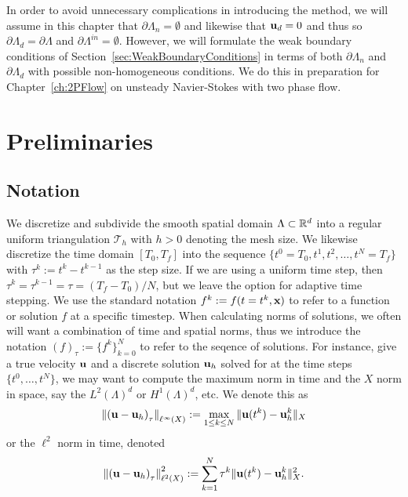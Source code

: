 \documentclass[letterpaper]{erdc}
\begin{document}
In order to avoid unnecessary complications in introducing the method, we will assume in this chapter that $\partial\Lambda_n=\emptyset$ and  likewise that $\textbf{u}_d = 0$ and thus so $\partial\Lambda_d=\partial\Lambda$ and $\partial\Lambda^{in}=\emptyset$.  However, we will formulate the weak boundary conditions of Section~\ref{sec:WeakBoundaryConditions} in terms of both $\partial\Lambda_n$ and $\partial\Lambda_d$ with possible non-homogeneous conditions.  We do this in preparation for Chapter~\ref{ch:2PFlow} on unsteady Navier-Stokes with two phase flow.


%
%
%
\section{Preliminaries}


%
%
\subsection{Notation}
We discretize and subdivide the smooth spatial domain $\Lambda\subset \mathbb{R}^d$ into a regular uniform triangulation $\mathcal{T}_h$ with $h>0$ denoting the mesh size.  We likewise discretize the time domain $[T_0,T_f]$ into the sequence $\{ t^0=T_0, t^1, t^2, \dots, t^N = T_f\}$  with $\tau^k:= t^k-t^{k-1}$ as the step size.  If we are using a uniform time step, then $\tau^k = \tau^{k-1} = \tau = (T_f-T_0)/N$, but we leave the option for adaptive time stepping.  We use the standard notation $f^{k} := f(t=t^k,\textbf{x})$ to refer to a function or solution $f$ at a specific timestep.  When calculating norms of solutions, we often will want a combination of time and spatial norms,  thus we introduce the notation $\left( f \right)_{\tau}:= \{ f^k \}_{k=0}^{N}$ to refer to the seqence of solutions.  For instance, give a true velocity $\textbf{u}$ and a discrete solution $\textbf{u}_h$ solved for at the time steps $\{t^0,\dots, t^{N}\}$, we may want to compute the maximum norm in time and the $X$ norm in space, say the $L^2(\Lambda)^d$ or $H^1(\Lambda)^d$, etc.  We denote this as
\begin{equation}
  \left\| \left( \textbf{u} - \textbf{u}_h \right)_{\tau} \right\|_{\ell^{\infty}(X)} := \max_{1\leq k \leq N} \| \textbf{u}(t^{k}) - \textbf{u}_h^{k}\|_{X}
\end{equation}
or the $\ell^2$ norm in time, denoted
\begin{equation}
  \left\| \left( \textbf{u} - \textbf{u}_h \right)_{\tau} \right\|^2_{\ell^{2}(X)} :=  \sum_{k=1}^{N} \tau^{k}\| \textbf{u}(t^{k}) - \textbf{u}_h^{k}\|^2_{X}.
\end{equation}
\end{document}
